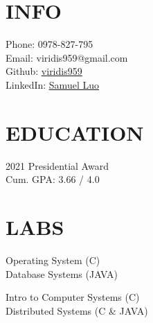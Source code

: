 \documentclass[]{resume}
\begin{document}
%
%

%
%

\begin{minipage}[t]{0.3\textwidth} 


\section{INFO}
Phone: 0978-827-795 \\
Email: viridis959@gmail.com \\
Github: \href{https://github.com/viridis959}{\underline{viridis959}} \\
LinkedIn: \href{https://www.linkedin.com/in/samuel-luo-9b15671b5}{\underline{Samuel Luo}}
\sectionsep


\section{EDUCATION} 
2021 Presidential Award \\
Cum. GPA: 3.66 / 4.0
\sectionsep


\section{LABS}
Operating System (C) \\
Database Systems (JAVA)
\sectionsep

Intro to Computer Systems (C) \\
Distributed Systems (C \& JAVA)
\sectionsep



\end{minipage}
\end{document}
